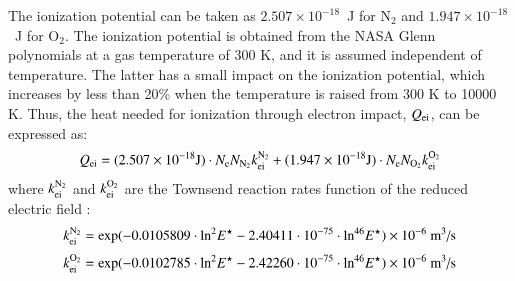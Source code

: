 \documentclass{warpdoc}
\newcommand{\mfd}{\displaystyle}
\let\citen\cite
\begin{document}
The ionization potential  can be taken as $2.507 \times 10^{-18}$~J for N$_2$ and $1.947 \times 10^{-18}$~J for O$_2$. The ionization potential is obtained from the NASA Glenn polynomials \citen{nasa:2002:mcbride} at a gas temperature of 300 K, and it is assumed independent of temperature. The latter has a small impact on the ionization potential, which increases by less than 20\% when the temperature is raised from 300 K to 10000 K. Thus, the heat needed for ionization through electron impact, $Q_{\rm ei}$, can be expressed as:
%
\begin{equation} 
 \begin{array}{r}\mfd
 Q_{\rm ei}= (2.507 \times 10^{-18} {\rm J}) \cdot N_{\rm e} N_{\rm N_2} k_{\rm ei}^{\rm N_2}
           + (1.947 \times 10^{-18} {\rm J}) \cdot  N_{\rm e} N_{\rm O_2} k_{\rm ei}^{\rm O_2}
 \end{array}
\end{equation}
%
where $k_{\rm ei}^{\rm N_2}$ and $k_{\rm ei}^{\rm O_2}$ are the Townsend reaction rates function of the reduced electric field \cite{jcp:2014:parent}:
%
\begin{equation}
 k_{\rm ei}^{\rm N_2}={\rm exp}(-0.0105809\cdot {\rm ln}^2 E^\star - 2.40411\cdot 10^{-75} \cdot {\rm ln}^{46}E^\star)\times 10^{-6}~\textrm{m$^3$/s}
\end{equation}
%
%
\begin{equation}
 k_{\rm ei}^{\rm O_2}= {\rm exp}(-0.0102785\cdot {\rm ln}^2 E^\star - 2.42260\cdot 10^{-75} \cdot {\rm ln}^{46}E^\star)\times 10^{-6}~\textrm{m$^3$/s}
\end{equation}
%
\end{document}
